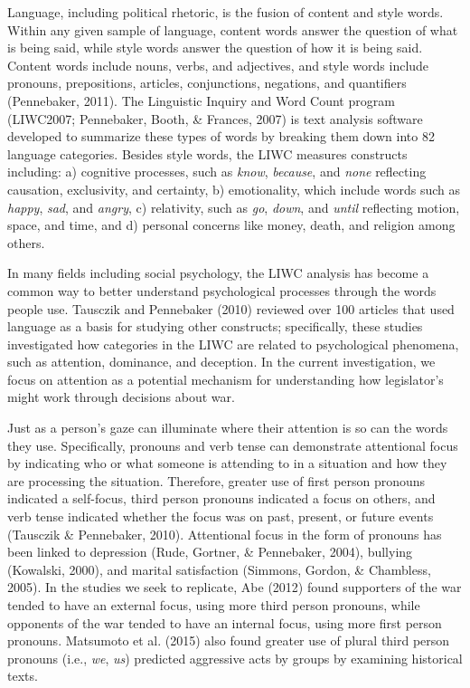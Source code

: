 \documentclass[english,,man,floatsintext]{apa6}
\begin{document}
Language, including political rhetoric, is the fusion of content and style words. Within any given sample of language, content words answer the question of what is being said, while style words answer the question of how it is being said. Content words include nouns, verbs, and adjectives, and style words include pronouns, prepositions, articles, conjunctions, negations, and quantifiers (Pennebaker, 2011). The Linguistic Inquiry and Word Count program (LIWC2007; Pennebaker, Booth, \& Frances, 2007) is text analysis software developed to summarize these types of words by breaking them down into 82 language categories. Besides style words, the LIWC measures constructs including: a) cognitive processes, such as \emph{know}, \emph{because}, and \emph{none} reflecting causation, exclusivity, and certainty, b) emotionality, which include words such as \emph{happy}, \emph{sad}, and \emph{angry}, c) relativity, such as \emph{go}, \emph{down}, and \emph{until} reflecting motion, space, and time, and d) personal concerns like money, death, and religion among others.

In many fields including social psychology, the LIWC analysis has become a common way to better understand psychological processes through the words people use. Tausczik and Pennebaker (2010) reviewed over 100 articles that used language as a basis for studying other constructs; specifically, these studies investigated how categories in the LIWC are related to psychological phenomena, such as attention, dominance, and deception. In the current investigation, we focus on attention as a potential mechanism for understanding how legislator's might work through decisions about war.

Just as a person's gaze can illuminate where their attention is so can the words they use. Specifically, pronouns and verb tense can demonstrate attentional focus by indicating who or what someone is attending to in a situation and how they are processing the situation. Therefore, greater use of first person pronouns indicated a self-focus, third person pronouns indicated a focus on others, and verb tense indicated whether the focus was on past, present, or future events (Tausczik \& Pennebaker, 2010). Attentional focus in the form of pronouns has been linked to depression (Rude, Gortner, \& Pennebaker, 2004), bullying (Kowalski, 2000), and marital satisfaction (Simmons, Gordon, \& Chambless, 2005). In the studies we seek to replicate, Abe (2012) found supporters of the war tended to have an external focus, using more third person pronouns, while opponents of the war tended to have an internal focus, using more first person pronouns. Matsumoto et al. (2015) also found greater use of plural third person pronouns (i.e., \emph{we}, \emph{us}) predicted aggressive acts by groups by examining historical texts.
\end{document}
